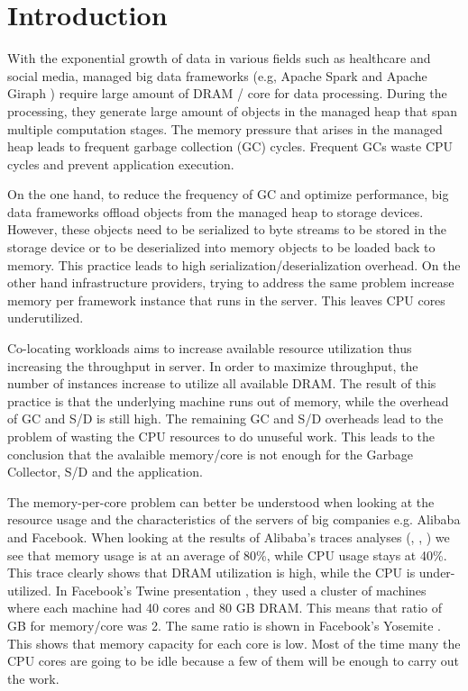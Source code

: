 \section{Introduction}
\label{sec:intro}

With the exponential growth of data in various fields such as
healthcare and social media, managed big data frameworks (e.g, Apache
Spark \cite{Spark} and Apache Giraph \cite{Giraph}) require large
amount of DRAM / core for data processing. During the processing, they generate large
amount of objects in the managed heap that span multiple computation
stages. The memory pressure that arises in the managed heap leads to
frequent garbage collection (GC) cycles. Frequent GCs waste CPU cycles 
and prevent application execution.

On the one hand, to reduce the frequency of GC and optimize performance, big data
frameworks offload objects from the managed heap to storage devices. However, these
objects need to be serialized to byte streams to be stored in the storage
device or to be deserialized into memory objects to be loaded back to memory. 
This practice leads to high serialization/deserialization overhead.
On the other hand infrastructure providers, trying to address the same problem increase memory per framework instance that runs in the server. This leaves CPU cores underutilized. 

Co-locating workloads aims to increase available resource utilization
thus increasing the throughput in server. 
In order to maximize throughput, the number of instances
increase to utilize all available DRAM. The result of this
practice is that the underlying machine runs out of memory, while the
 overhead of GC and S/D is still high. The remaining GC and S/D
overheads lead to the problem of wasting the CPU resources
to do unuseful work. This leads to the conclusion that the avalaible memory/core is
not enough for the Garbage Collector, S/D and the application.

The memory-per-core problem can better be understood when looking at
the resource usage and the characteristics of the servers of big
companies e.g. Alibaba and Facebook. When looking at the results of
Alibaba's traces analyses (\cite{Alibaba}, \cite{Alibaba1},
\cite{Alibabacolocated}) we see that memory usage is at an average of
80\%, while CPU usage stays at 40\%. This trace clearly shows that
DRAM utilization is high, while the CPU is under-utilized. In
Facebook's Twine presentation \cite{Twine}, they used a cluster of
machines where each machine had 40 cores and 80 GB DRAM. This means
that ratio of GB for memory/core was 2. The same ratio is shown in Facebook's Yosemite
\cite{Yosemite}. This shows that memory
capacity for each core is low. Most of the time many the CPU cores are
going to be idle because a few of them will be enough to carry out the
work.

